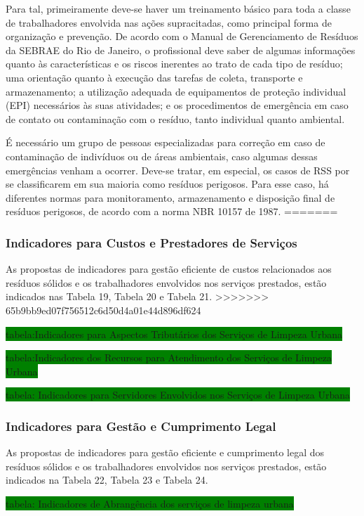 	Para tal, primeiramente deve-se haver um treinamento básico para toda a classe de trabalhadores envolvida nas ações supracitadas, como principal forma de organização e prevenção. De acordo com  o Manual de Gerenciamento de Resíduos da SEBRAE do Rio de Janeiro, o profissional deve saber de algumas informações quanto às características e os riscos inerentes ao trato de cada tipo de resíduo; uma orientação quanto à execução das tarefas de coleta, transporte e armazenamento; a utilização adequada de equipamentos de proteção individual (EPI) necessários às suas atividades; e os procedimentos de emergência em caso de contato ou contaminação com o resíduo, tanto individual quanto ambiental.
	
	É necessário um grupo de pessoas especializadas para correção em caso de contaminação de indivíduos ou de áreas ambientais, caso algumas dessas emergências venham a ocorrer. Deve-se tratar, em especial, os casos de RSS por se classificarem em sua maioria como resíduos perigosos. Para esse caso, há diferentes normas para monitoramento, armazenamento e disposição final de resíduos perigosos, de acordo com a norma NBR 10157 de 1987.
=======
	\subsubsection{Indicadores para Custos e Prestadores de Serviços}
	As propostas de indicadores para gestão eficiente de custos relacionados aos resíduos sólidos e os trabalhadores envolvidos nos serviços prestados, estão indicados nas Tabela 19, Tabela 20 e Tabela 21.
>>>>>>> 65b9bb9ed07f756512c6d50d4a01e44d896df624
	
	\colorbox{green}{tabela:Indicadores para Aspectos Tributários dos Serviços de Limpeza Urbana}
	
	\colorbox{green}{tabela:Indicadores dos Recursos para Atendimento dos Serviços de Limpeza Urbana}
	
	\colorbox{green}{tabela: Indicadores para Servidores Envolvidos nos Serviços de Limpeza Urbana}
	
	\subsubsection{Indicadores para Gestão e Cumprimento Legal }
	As propostas de indicadores para gestão eficiente e cumprimento legal dos resíduos sólidos e os trabalhadores envolvidos nos serviços prestados, estão indicados na Tabela 22, Tabela 23 e Tabela 24.
	
	\colorbox{green}{tabela: Indicadores de Abrangência dos serviços de limpeza urbana}
	
